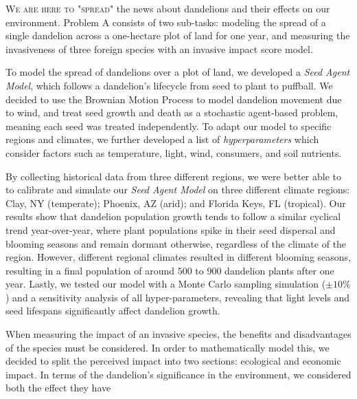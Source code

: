 \textsc{We are here to "spread"} the news about dandelions and their effects on our environment. Problem A consists of two sub-tasks: modeling the spread of a single dandelion across a one-hectare plot of land for one year, and measuring the invasiveness of three foreign species with an invasive impact score model.
  
To model the spread of dandelions over a plot of land, we developed a \textit{Seed Agent Model}, which follows a dandelion's lifecycle from seed to plant to puffball. We decided to use the Brownian Motion Process to model dandelion movement due to wind, and treat seed growth and death as a stochastic agent-based problem, meaning each seed was treated independently. To adapt our model to specific regions and climates, we further developed a list of \textit{hyperparameters} which consider factors such as temperature, light, wind, consumers, and soil nutrients. 

By collecting historical data from three different regions, we were better able to to calibrate and simulate our \textit{Seed Agent Model} on three different climate regions: Clay, NY (temperate); Phoenix, AZ (arid); and Florida Keys, FL (tropical). Our results show that dandelion population growth tends to follow a similar cyclical trend year-over-year, where plant populations spike in their seed dispersal and blooming seasons and remain dormant otherwise, regardless of the climate of the region. However, different regional climates resulted in different blooming seasons, resulting in a final population of around \(500\) to \(900\) dandelion plants after one year. Lastly, we tested our model with a Monte Carlo sampling simulation (\(\pm 10\%\)) and a sensitivity analysis of all hyper-parameters, revealing that light levels and seed lifespans significantly affect dandelion growth.

When measuring the impact of an invasive species, the benefits and disadvantages of the species must be considered. In order to mathematically model this, we decided to split the perceived impact into two sections: ecological and economic impact. In terms of the dandelion's significance in the environment, we considered both the effect they have  




